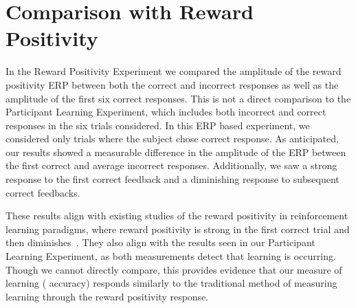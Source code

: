 \section{Comparison with Reward Positivity}

In the Reward Positivity Experiment we compared the amplitude of the reward 
positivity ERP between both the correct and incorrect responses as well as the 
amplitude of the first six correct responses. This is not a direct comparison 
to the Participant Learning Experiment, which includes both incorrect and 
correct responses in the six trials considered. In this ERP based experiment, 
we considered only trials where the subject chose correct response.  As 
anticipated, our results showed a measurable difference in the amplitude of the 
ERP between the first correct and average incorrect responses. Additionally, we 
saw a strong response to the first correct feedback and a diminishing response 
to subsequent correct feedbacks.

These results align with existing studies of the reward positivity in 
reinforcement learning paradigms, where reward positivity is strong in the 
first correct trial and then 
diminishes~\cite{krigolson2014we,krigolson2009learning,bellebaum2014feedback}. 
They also align with the results seen in our Participant Learning Experiment, 
as both measurements detect that learning is occurring. Though we cannot 
directly compare, this provides evidence that our measure of learning (\tvt 
accuracy) responds similarly to the traditional method of measuring learning 
through the reward positivity response.
